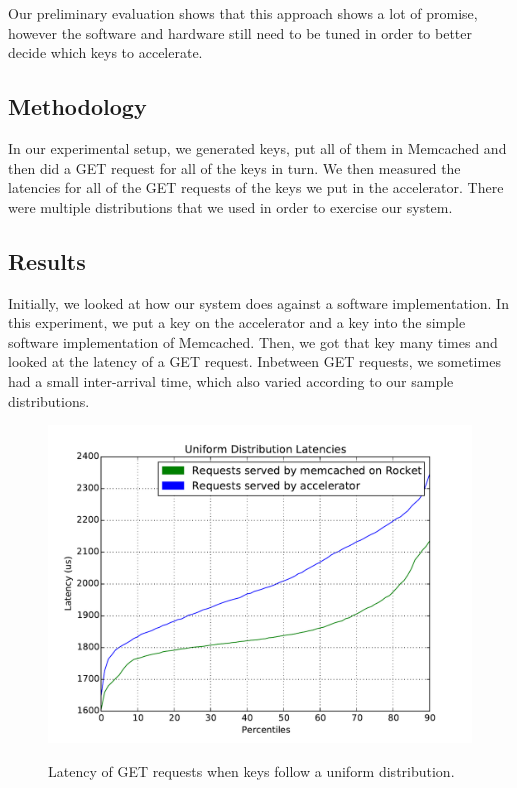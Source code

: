 Our preliminary evaluation shows that this approach shows a lot of promise,
however the software and hardware still need to be tuned in order to better
decide which keys to accelerate.

\subsection{Methodology}

In our experimental setup, we generated keys, put all of them in Memcached and
then did a GET request for all of the keys in turn. We then measured the
latencies for all of the GET requests of the keys we put in the accelerator.
There were multiple distributions that we used in order to exercise our system.


\subsection{Results}

Initially, we looked at how our system does against a software implementation.
In this experiment, we put a key on the accelerator and a key into the simple
software implementation of Memcached. Then, we got that key many times and
looked at the latency of a GET request. Inbetween GET requests, we sometimes
had a small inter-arrival time, which also varied according to our sample
distributions.


\begin{figure}[t]
\begin{center}
\label{fig:unif}
\includegraphics[width=\linewidth]{unif.pdf}
\caption{Latency of GET requests when keys follow a uniform distribution.}
\end{center}
\end{figure}

